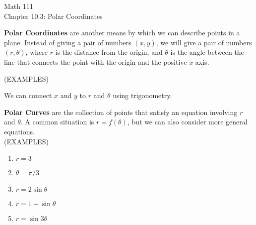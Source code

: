 \documentclass[11pt]{article}
\begin{document}
\begin{center}
\Large
\rm{Math 111}
\\
\rm{Chapter 10.3: Polar Coordinates }
\\
\end{center}
\vspace{0.2in}

{\bf Polar Coordinates} are another means by which we can describe points in a plane.  Instead of giving a pair
of numbers $(x,y)$, we will give a pair of numbers $(r,\theta)$, where $r$ is the distance from the origin, and
$\theta$ is the angle between the line that connects the point with the origin and the positive $x$ axis.





\vspace{2in}


(EXAMPLES)

\vspace{2.in}

We can connect $x$ and $y$ to $r$ and $\theta$ using trigonometry.

\vspace{2in}



\pagebreak

{\bf Polar Curves} are the collection of points that satisfy an equation involving $r$ and $\theta$.
A common situation is $r = f(\theta)$, but we can also consider more general equations.\\

\vspace{.1in}
(EXAMPLES)
\begin{enumerate}
\item{$r = 3$}
\vspace{1.5in}
\item{$\theta = \pi/3$}
  \vspace{1.5in}
      \item{$r = 2\sin{\theta}$}
\vspace{2in}
      \item{$r = 1 + \sin{\theta}$}
\vspace{2in}


\pagebreak

\item{$r = \sin{3\theta}$}
  \vspace{2.5in}
  \end{enumerate}


\vspace{1in}
\end{document}
